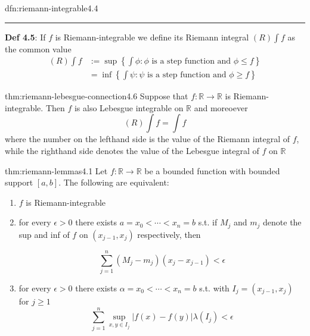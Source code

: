 \documentclass[landscape, 8pt]{extarticle}
\begin{document}
\begin{multicols}{3}
\begin{dfn}{dfn:riemann-integrable}{4.4}
	\noindent\rule{\textwidth}{0.2pt}
	\textbf{Def 4.5}: If $f$ is Riemann-integrable we define its Riemann integral $(R) \int f$ as the common value
	\begin{align*}
		(R) \int f&:= \sup \left\{\int \phi : \text{$\phi$ is a step function and $\phi \le f$}\right\} \\
		&= \inf \left\{\int \psi : \text{$\psi$ is a step function and $\phi \ge f$}\right\}
	\end{align*}
\end{dfn}

\begin{thm}{thm:riemann-lebesgue-connection}{4.6}
	Suppose that $f : \mathbb{R} \to \mathbb{R}$ is Riemann-integrable. Then $f$ is also Lebesgue integrable on $\mathbb{R}$ and moreoever
	\[(R) \int f = \int f\]
	where the number on the lefthand side is the value of the Riemann integral of $f$, while the righthand side denotes the value of the Lebesgue integral of $f$ on $\mathbb{R}$
\end{thm}

\newpage
\vspace{-6pt}
\begin{thm}{thm:riemann-lemmas}{4.1}
	\vspace{-5pt}
	Let $f : \mathbb{R} \to \mathbb{R}$ be a bounded function with bounded support $[a, b]$. The following are equivalent:

	\vspace{-5pt}
	\begin{enumerate}[leftmargin=*]
	    \item $f$ is Riemann-integrable
			\vspace{-3pt}
	    \item for every $\epsilon > 0$ there exists $a = x_{0} < \cdots < x_{n} = b$ s.t. if $M_{j}$ and $m_{j}$ denote the sup and inf of $f$ on $(x_{j-1}, x_{j})$ respectively, then

			\vspace{-13pt}
			\[\sum_{j = 1}^{n}(M_{j} - m_{j})(x_{j} - x_{j - 1}) < \epsilon\]
		\item for every $\epsilon > 0$ there exists $\alpha = x_{0} < \cdots < x_{n} = b$ s.t. with $I_{j} = (x_{j-1}, x_{j})$ for $j \ge 1$
			\[\sum_{j = 1}^{n} \sup_{x,y\in I_{j}} \lvert f(x) - f(y) \rvert \lambda(I_{j}) < \epsilon\]
	\end{enumerate}


\end{thm}
\end{multicols}
\end{document}
